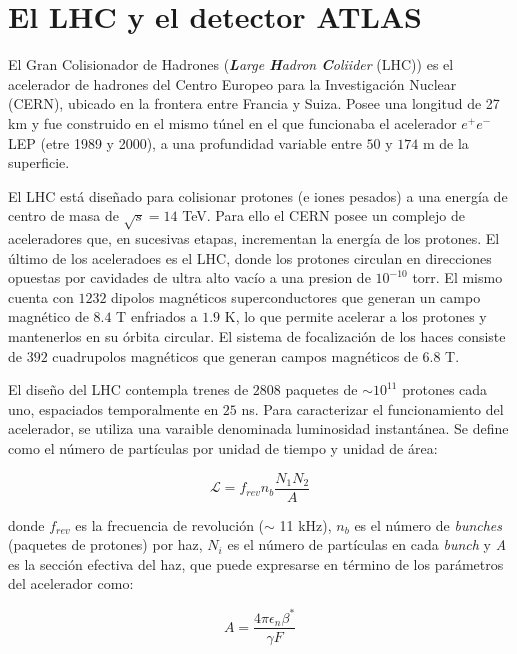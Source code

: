 \chapter{El LHC y el detector ATLAS}


El Gran Colisionador de Hadrones (\textit{\textbf{L}arge \textbf{H}adron \textbf{C}oliider} (LHC)) es el acelerador de hadrones del Centro Europeo para la Investigación Nuclear (CERN), ubicado en la frontera entre Francia y Suiza. Posee una longitud de 27 km y fue construido en el mismo túnel en el que funcionaba el acelerador $e^{+}e^{-}$ LEP (etre 1989 y 2000), a una profundidad variable entre $50$ y $174$ m de la superficie.

El LHC está diseñado para colisionar protones (e iones pesados) a una energía de centro de masa de $\sqrt{s}=14$ TeV. Para ello el CERN posee un complejo de aceleradores que, en sucesivas etapas, incrementan la energía de los protones. El último de los aceleradoes es el LHC, donde los protones circulan en direcciones opuestas por cavidades de ultra alto vacío a una presion de $10^{-10}$ torr. El mismo cuenta con $1232$ dipolos magnéticos superconductores que generan un campo magnético de $8.4$ T enfriados a $1.9$ K, lo que permite acelerar a los protones y mantenerlos en su órbita circular. El sistema de focalización de los haces consiste de $392$ cuadrupolos magnéticos que generan campos magnéticos de $6.8$ T.

El diseño del LHC contempla trenes de $2808$ paquetes de $\sim 10^{11}$ protones cada uno, espaciados temporalmente en $25$ ns. Para caracterizar el funcionamiento del acelerador, se utiliza una varaible denominada luminosidad instantánea. Se define como el número de partículas por unidad de tiempo y unidad de área:

\begin{equation}
\mathcal{L}=f_{rev}n_{b}\frac{N_{1}N_{2}}{A}
\end{equation}

donde $f_{rev}$ es la frecuencia de revolución ($\sim$ 11 kHz), $n_{b}$ es el número de \textit{bunches} (paquetes de protones) por haz, $N_{i}$ es el número de partículas en cada \textit{bunch} y \textit{A} es la sección efectiva del haz, que puede expresarse en término de los parámetros del acelerador como:

\begin{equation}
A=\frac{4 \pi \epsilon_{n}\beta^{*}}{\gamma F}
\end{equation}


